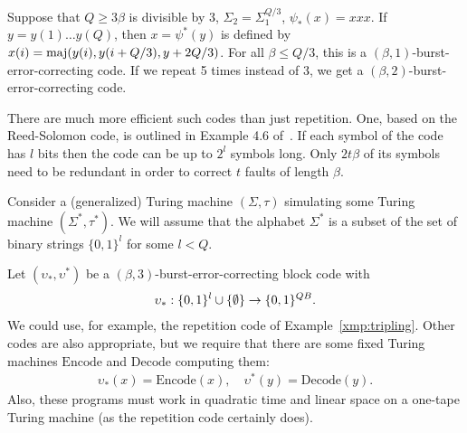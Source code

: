 \documentclass[11pt]{memoir}
\theoremstyle{definition} %
\renewcommand{\le}{\leq}
\renewcommand{\ge}{\geq}
\def\B{B}
\newcommand{\F}{F}
\newcommand{\Int}{\mathrm{Int}} %
\newcommand{\Q}{Q} %
\newcommand{\Decode}{\mathrm{Decode}}
\newcommand{\Encode}{\mathrm{Encode}}
\newcommand{\PadLen}{\mathit{PadLen}} %
\begin{document}
\begin{example}\label{xmp:tripling}
  Suppose that \( \Q\ge 3\beta \) is divisible by 3,
  \( \Sigma_{2}=\Sigma_{1}^{\Q/3} \), \( \psi_{*}(x)=xxx \).
  If \( y=y(1)\dots y(\Q) \), then \( x=\psi^{*}(y) \) is defined by
    \( x(i)=\maj(y(i),y(i+\Q/3),y+2\Q/3) \).
    For all \( \beta\le \Q/3 \), this is a
    \( (\beta,1) \)-burst-error-correcting code.
    If we repeat 5 times instead of 3, we get a \( (\beta,2) \)-burst-error-correcting
    code.
  \end{example}

  \begin{example}\label{xmp:Reed-Solomon}
    There are much more efficient such codes than just repetition.
    One, based on the Reed-Solomon code, is outlined in Example 4.6
    of~\cite{GacsSorg01}.
    If each symbol of the code has \( l \) bits then the code can be up to \( 2^{l} \) symbols long.
    Only \( 2 t\beta \) of its symbols need to be redundant in order
    to correct \( t \) faults of length \( \beta \).
  \end{example}

Consider a (generalized) Turing machine 
\( (\Sigma,\tau) \) simulating some Turing machine \( (\Sigma^{*},\tau^{*}) \).
We will assume that the alphabet \( \Sigma^{*} \) is a subset of the set of  binary strings
\( \{0,1\}^{l} \) for some \( l<\Q \).


Let \( (\upsilon_{*}, \upsilon^{*}) \) be a \( (\beta,3) \)-burst-error-correcting block code
with
\begin{align*}
  \upsilon_{*}: \{0,1\}^{l} \cup \set{\emptyset}
   \to\{0,1\}^{Q\B}.
\end{align*}
We could use, for example, the repetition code of Example~\ref{xmp:tripling}.
Other codes are also appropriate, but we require that there are some fixed Turing machines
\( \Encode \) and \( \Decode \) computing them:
 \begin{align*}
   \upsilon_{*}(x)=\Encode(x),\quad 
   \upsilon^{*}(y)=\Decode( y).
 \end{align*}
Also, these programs must work in quadratic time and linear space on a one-tape
Turing machine (as the repetition code certainly does).
\end{document}
